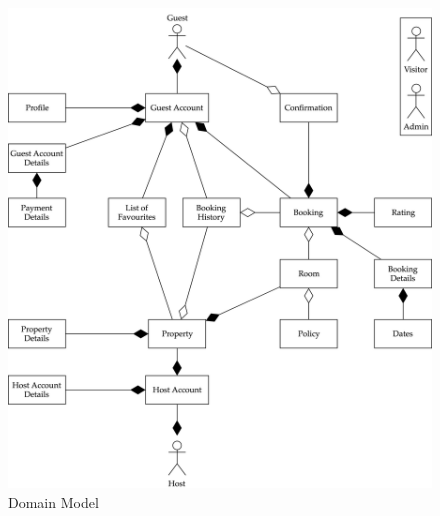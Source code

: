 \begin{figure}[H]
    \centering
    \includegraphics[width=\textwidth]{img/domain_model.png}
    \caption{Domain Model}
    \label{domain_model}
\end{figure}